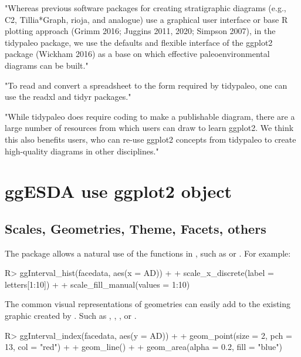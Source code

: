 \documentclass[article]{jss}
\begin{document}
"Whereas previous software packages for creating stratigraphic diagrams (e.g., C2, Tillia*Graph, rioja,
and analogue) use a graphical user interface or base R plotting approach (Grimm 2016; Juggins
2011, 2020; Simpson 2007), in the tidypaleo package, we use the defaults and flexible interface of the ggplot2 package (Wickham 2016) as a base on which effective paleoenvironmental
diagrams can be built."

"To read and convert a spreadsheet to the form required by tidypaleo, one can use the readxl and tidyr packages."


"While tidypaleo does require coding to make a publishable diagram, there are a large number of resources from which users can draw to learn ggplot2. We think this also benefits users, who can re-use ggplot2 concepts from tidypaleo to
create high-quality diagrams in other disciplines."


\section*{ggESDA use ggplot2 object}
\subsection{Scales, Geometries, Theme, Facets, others}

The  package allows a natural use of the  functions in , such as  or . For example:
\begin{CodeChunk}
\begin{CodeInput}
R> ggInterval_hist(facedata, aes(x = AD)) +
+      scale_x_discrete(label = letters[1:10]) +
+      scale_fill_manual(values = 1:10)
\end{CodeInput}
\end{CodeChunk}

The common visual representations of  geometries can easily add to the existing graphic created by . Such as , , , or .
\begin{CodeChunk}
\begin{CodeInput}
R> ggInterval_index(facedata, aes(y = AD)) +
+      geom_point(size = 2, pch = 13, col = "red") +
+      geom_line() +
+      geom_area(alpha = 0.2, fill = "blue")
\end{CodeInput}
\end{CodeChunk}
\end{document}
